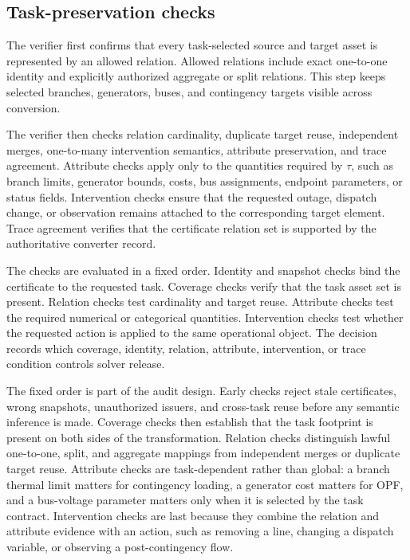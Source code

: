 \documentclass[preprint,12pt]{elsarticle}
\begin{document}
\subsection{Task-preservation checks}

The verifier first confirms that every task-selected source and target asset is represented by an allowed relation. Allowed relations include exact one-to-one identity and explicitly authorized aggregate or split relations. This step keeps selected branches, generators, buses, and contingency targets visible across conversion.

The verifier then checks relation cardinality, duplicate target reuse, independent merges, one-to-many intervention semantics, attribute preservation, and trace agreement. Attribute checks apply only to the quantities required by $\tau$, such as branch limits, generator bounds, costs, bus assignments, endpoint parameters, or status fields. Intervention checks ensure that the requested outage, dispatch change, or observation remains attached to the corresponding target element. Trace agreement verifies that the certificate relation set is supported by the authoritative converter record.

The checks are evaluated in a fixed order. Identity and snapshot checks bind the certificate to the requested task. Coverage checks verify that the task asset set is present. Relation checks test cardinality and target reuse. Attribute checks test the required numerical or categorical quantities. Intervention checks test whether the requested action is applied to the same operational object. The decision records which coverage, identity, relation, attribute, intervention, or trace condition controls solver release.

The fixed order is part of the audit design. Early checks reject stale certificates, wrong snapshots, unauthorized issuers, and cross-task reuse before any semantic inference is made. Coverage checks then establish that the task footprint is present on both sides of the transformation. Relation checks distinguish lawful one-to-one, split, and aggregate mappings from independent merges or duplicate target reuse. Attribute checks are task-dependent rather than global: a branch thermal limit matters for contingency loading, a generator cost matters for OPF, and a bus-voltage parameter matters only when it is selected by the task contract. Intervention checks are last because they combine the relation and attribute evidence with an action, such as removing a line, changing a dispatch variable, or observing a post-contingency flow.
\end{document}
